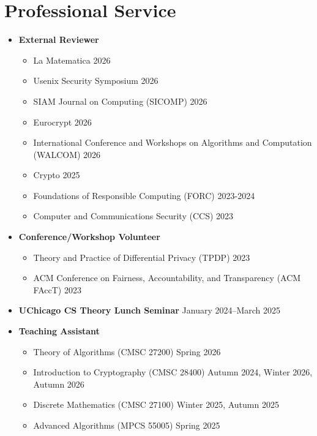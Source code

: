 
\section*{Professional Service}

\begin{itemize}
    \item \textbf{External Reviewer}
    \begin{itemize}
        \item La Matematica \hfill 2026
        \item Usenix Security Symposium \hfill 2026
        \item SIAM Journal on Computing (SICOMP) \hfill 2026
        \item Eurocrypt \hfill 2026
        \item International Conference and Workshops on Algorithms and Computation (WALCOM) \hfill 2026
        \item Crypto \hfill 2025
        \item Foundations of Responsible Computing (FORC) \hfill 2023-2024
        \item Computer and Communications Security (CCS) \hfill 2023
    \end{itemize}
    \item \textbf{Conference/Workshop Volunteer}
    \begin{itemize}
        \item Theory and Practice of Differential Privacy (TPDP) \hfill 2023
        \item ACM Conference on Fairness, Accountability, and Transparency (ACM FAccT) \hfill 2023
    \end{itemize}
    \item \textbf{UChicago CS Theory Lunch Seminar} \hfill January 2024--March 2025
    \item \textbf{Teaching Assistant}
    \begin{itemize}
        \item Theory of Algorithms (CMSC 27200) \hfill Spring 2026
        \item Introduction to Cryptography (CMSC 28400) \hfill Autumn 2024, Winter 2026, Autumn 2026
        \item Discrete Mathematics (CMSC 27100) \hfill Winter 2025, Autumn 2025
        \item Advanced Algorithms (MPCS 55005) \hfill Spring 2025
    \end{itemize}
\end{itemize}

